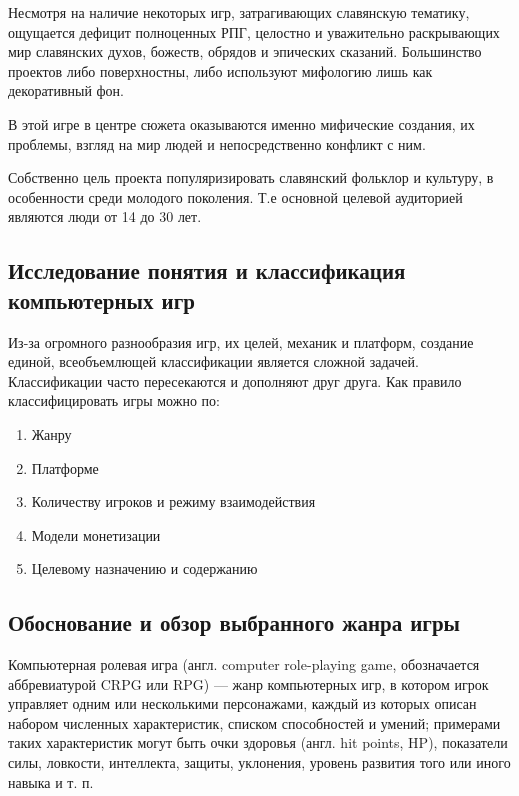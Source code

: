\documentclass[bachelor, och, coursework, times]{SCWorks}
\begin{document}
    Несмотря на наличие некоторых игр, затрагивающих славянскую тематику, 
    ощущается дефицит полноценных РПГ, целостно и уважительно раскрывающих мир славянских духов, 
    божеств, обрядов и эпических сказаний. Большинство проектов либо поверхностны, 
    либо используют мифологию лишь как декоративный фон.

    В этой игре в центре сюжета оказываются именно мифические создания, их проблемы,
    взгляд на мир людей и непосредственно конфликт с ним.

    Собственно цель проекта популяризировать славянский фольклор и культуру, в особенности
    среди молодого поколения. Т.е основной целевой аудиторией являются
    люди от 14 до 30 лет. 


    \subsection{Исследование понятия и классификация компьютерных игр}

    Из-за огромного разнообразия игр, их целей, механик и платформ, создание единой, 
    всеобъемлющей классификации является сложной задачей. 
    Классификации часто пересекаются и дополняют друг друга. 
    Как правило классифицировать игры можно по:

      \begin{enumerate}
     
\item Жанру
\item Платформе
\item Количеству игроков и режиму взаимодействия
\item Модели монетизации
\item Целевому назначению и содержанию

\end{enumerate}


    \subsection{Обоснование и обзор выбранного жанра игры}
    
    Компьютерная ролевая игра (англ. computer role-playing game, 
    обозначается аббревиатурой CRPG или RPG) — жанр компьютерных игр, 
    в котором игрок управляет одним или несколькими персонажами, 
    каждый из которых описан набором численных характеристик, 
    списком способностей и умений; примерами таких характеристик могут быть очки здоровья 
    (англ. hit points, HP), показатели силы, ловкости, интеллекта, защиты, уклонения,
     уровень развития того или иного навыка и т. п.\cite{gamedes}
\end{document}
